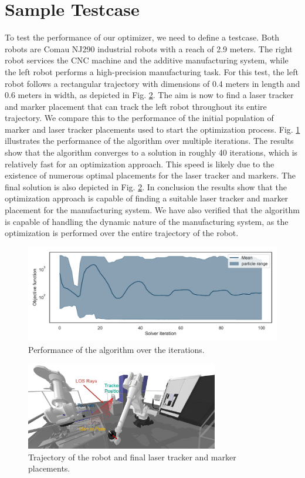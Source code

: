 \documentclass{svproc}
\begin{document}
\section{Sample Testcase}
To test the performance of our optimizer, we need to define a testcase.
Both robots are Comau NJ290 industrial robots with a reach of 2.9 meters.
The right robot services the CNC machine and the additive manufacturing system, while the left robot performs a high-precision manufacturing task.
For this test, the left robot follows a rectangular trajectory with dimensions of 0.4 meters in length and 0.6 meters in width, as depicted in Fig. \ref{fig:trajectory}.
The aim is now to find a laser tracker and marker placement that can track the left robot throughout its entire trajectory.
We compare this to the performance of the initial population of marker and laser tracker placements used to start the optimization process.
Fig. \ref{fig:iterations} illustrates the performance of the algorithm over multiple iterations.
The results show that the algorithm converges to a solution in roughly 40 iterations, which is relatively fast for an optimization approach.
This speed is likely due to the existence of numerous optimal placements for the laser tracker and markers.
The final solution is also depicted in Fig. \ref{fig:trajectory}.
In conclusion the results show that the optimization approach is capable of finding a suitable laser tracker and marker placement for the manufacturing system.
We have also verified that the algorithm is capable of handling the dynamic nature of the manufacturing system, as the optimization is performed over the entire trajectory of the robot.

\begin{figure}
\centering
\includegraphics[width=\textwidth]{figures/iterations.pdf}
\caption{Performance of the algorithm over the iterations.}
\label{fig:iterations}
\end{figure}

\begin{figure}
\centering
\includegraphics[width=0.75\textwidth]{figures/trajectory.png}
\caption{Trajectory of the robot and final laser tracker and marker placements.}
\label{fig:trajectory}
\end{figure}
\end{document}
